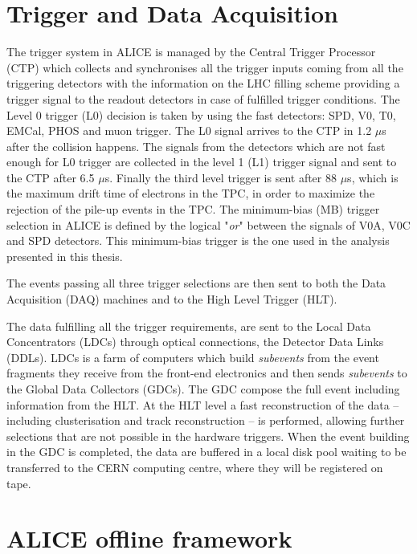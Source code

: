 %
%
\section{Trigger and Data Acquisition} \label{sec:data_flow}

The trigger system in ALICE is managed by the Central Trigger Processor (CTP) \cite{alice_trigger} 
which collects and synchronises all the trigger inputs coming from all the triggering detectors 
with the information on the LHC filling scheme providing a trigger signal to the readout detectors
in case of fulfilled trigger conditions. 
The Level 0 trigger (L0) decision is taken by using the fast detectors: SPD, V0, T0, EMCal, PHOS and 
muon trigger. The L0 signal arrives to the CTP in 1.2 $\mu$s after the collision happens. 
The signals from the detectors which are not fast enough for L0 trigger are collected in the level 1
(L1) trigger signal and sent to the CTP after 6.5 $\mu$s. 
Finally the third level trigger is sent after 88 $\mu$s, which is the maximum drift time of electrons
in the TPC, in order to maximize the rejection of the pile-up events in the TPC.
The minimum-bias (MB) trigger  selection in ALICE is defined by the logical "\textit{or}" between the
signals of V0A, V0C and SPD detectors. This minimum-bias trigger is the one used in the analysis
presented in this thesis.

The events passing all three trigger selections are then sent to both the Data Acquisition (DAQ) machines 
and to the High Level Trigger (HLT).


The data fulfilling all the trigger requirements, are sent to the Local Data Concentrators (LDCs)
through optical connections, the Detector Data Links (DDLs).
LDCs is a farm of computers which build \textit{subevents} from the event fragments they receive from
the front-end electronics and then sends \textit{subevents} to the Global Data Collectors (GDCs).
The GDC compose the full event including information from the HLT.
At the HLT level a fast reconstruction of the data -- including clusterisation and track reconstruction --
is performed, allowing further selections that are not possible in the hardware triggers.
When the event building in the GDC is completed, the data are buffered in a local disk pool waiting 
to be transferred to the CERN computing centre, where they will be registered on tape.

%
%
\section{ALICE offline framework} \label{sec:offline}

